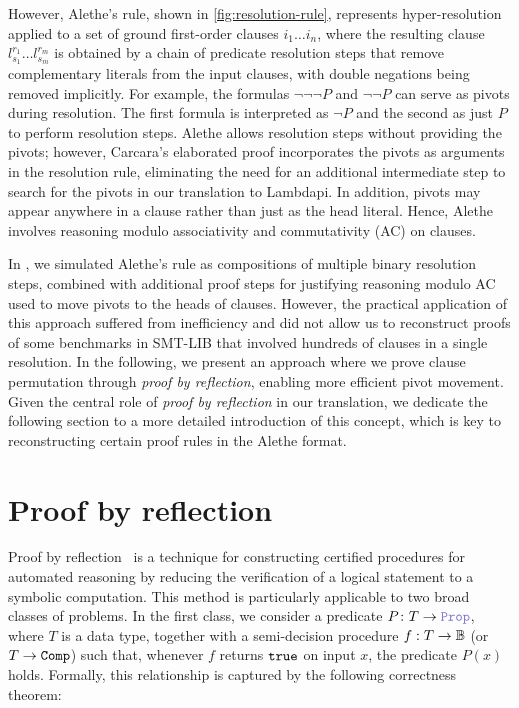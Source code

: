 However, Alethe's  rule, shown in \cref{fig:resolution-rule}, represents hyper-resolution applied to a set of ground first-order clauses $i_1 \dots i_n$,
where the resulting clause $l_{s_1}^{r_1} \dots l_{s_m}^{r_m}$ is obtained by a chain of predicate resolution steps that remove complementary literals from the input clauses, with double negations being removed implicitly.
For example, the formulas $\neg \neg \neg P$ and $\neg \neg P$ can serve as pivots during resolution.
The first formula is interpreted as $\neg P$ and the second as just $P$ to perform resolution steps.
Alethe allows resolution steps without providing the pivots; however, Carcara's elaborated proof incorporates the pivots as arguments in the resolution rule, eliminating the need for an additional intermediate step to search for the pivots in our translation to Lambdapi.
In addition, pivots may appear anywhere in a clause rather than just as the head literal. Hence, Alethe  involves reasoning modulo associativity and commutativity (AC) on clauses.

In \cite{ColtellacciMD24}, we simulated Alethe's  rule as compositions of multiple binary resolution steps, combined with additional proof steps for justifying reasoning modulo AC used to move pivots to the heads of clauses.
However, the practical application of this approach suffered from inefficiency and did not allow us to reconstruct proofs of some benchmarks in SMT-LIB that involved hundreds of clauses in a single resolution.
In the following, we present an approach where we prove clause permutation through \emph{proof by reflection}, enabling more efficient pivot movement.
Given the central role of \emph{proof by reflection} in our translation, we dedicate the following section to a more detailed introduction of this concept, which is key to reconstructing certain proof rules in the Alethe format.

\section{Proof by reflection}
\label{ssec:reflection-intro}

Proof by reflection~\cite{reflection-origin-coq} is a technique for constructing certified procedures for automated reasoning by reducing the verification of a logical statement to a symbolic computation.
This method is particularly applicable to two broad classes of problems. In the first class, we consider a predicate $P \colon T \to \prop$, where $T$ is a data type,
together with a semi-decision procedure $f: T \ra \mathbb{B}$ (or $T \ra \tt{Comp}$) such that, whenever $f$ returns $\tt{true}$ on input $x$, the predicate $P(x)$ holds.
Formally, this relationship is captured by the following correctness theorem:

